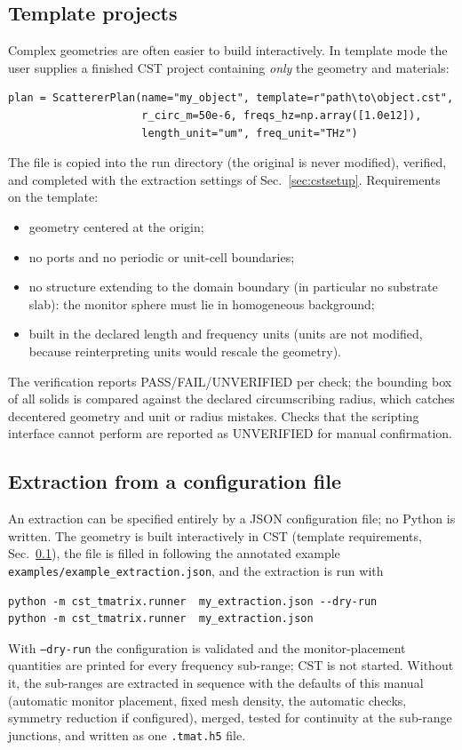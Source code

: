 \documentclass[11pt]{article}
\begin{document}
\subsection{Template projects}
\label{sec:template}
Complex geometries are often easier to build interactively.  In template
mode the user supplies a finished CST project containing \emph{only} the
geometry and materials:
\begin{verbatim}
plan = ScattererPlan(name="my_object", template=r"path\to\object.cst",
                     r_circ_m=50e-6, freqs_hz=np.array([1.0e12]),
                     length_unit="um", freq_unit="THz")
\end{verbatim}
The file is copied into the run directory (the original is never
modified), verified, and completed with the extraction settings of
Sec.~\ref{sec:cstsetup}.  Requirements on the template:
\begin{itemize}
\item geometry centered at the origin;
\item no ports and no periodic or unit-cell boundaries;
\item no structure extending to the domain boundary (in particular no
substrate slab): the monitor sphere must lie in homogeneous background;
\item built in the declared length and frequency units (units are not
modified, because reinterpreting units would rescale the geometry).
\end{itemize}
The verification reports PASS/FAIL/UNVERIFIED per check; the bounding box
of all solids is compared against the declared circumscribing radius,
which catches decentered geometry and unit or radius mistakes.  Checks
that the scripting interface cannot perform are reported as UNVERIFIED
for manual confirmation.

\subsection{Extraction from a configuration file}
\label{sec:noconfig}
An extraction can be specified entirely by a JSON configuration file;
no Python is written.  The geometry is built interactively in CST
(template requirements, Sec.~\ref{sec:template}), the file is filled
in following the annotated example
\texttt{examples/example\_extraction.json}, and the extraction is run
with
\begin{verbatim}
python -m cst_tmatrix.runner  my_extraction.json --dry-run
python -m cst_tmatrix.runner  my_extraction.json
\end{verbatim}
With \texttt{--dry-run} the configuration is validated and the
monitor-placement quantities are printed for every frequency
sub-range; CST is not started.  Without it, the sub-ranges are
extracted in sequence with the defaults of this manual (automatic
monitor placement, fixed mesh density, the automatic checks, symmetry
reduction if configured), merged, tested for continuity at the
sub-range junctions, and written as one \texttt{.tmat.h5} file.
\end{document}
